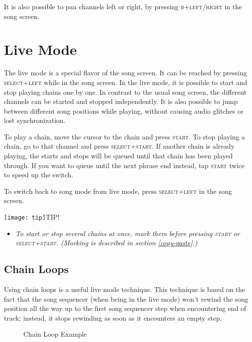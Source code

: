 It is also possible to pan channels left or right, by pressing \textsc{b+left/right} in the song screen.

\section{Live Mode}

 The live mode is a special flavor of the song screen. It can be reached by pressing \textsc{select+left} while in the song screen. In the live mode, it is possible to start and stop playing chains one by one. In contrast to the usual song screen, the different channels can be started and stopped independently. It is also possible to jump between different song positions while playing, without causing audio glitches or lost synchronization.

To play a chain, move the cursor to the chain and press \textsc{start}. To stop playing a chain, go to that channel and press \textsc{select+start}. If another chain is already playing, the starts and stops will be queued until that chain has been played through. If you want to queue until the next phrase end instead, tap \textsc{start} twice to speed up the switch.

To switch back to song mode from live mode, press \textsc{select+left} in the song screen.

\texttt{[image: tip]}TIP!
\begin{itemize}
        \item \textit{To start or stop several chains at once, mark them before pressing \textsc{start} or \textsc{select+start}. (Marking is described in section \ref{copy-paste}.)}
	\end{itemize}

\subsection{Chain Loops}

 Using chain loops is a useful live mode technique. This technique is based on the fact that the song sequencer (when being in the live mode) won't rewind the song position all the way up to the first song sequencer step when encountering end of track; instead, it stops rewinding as soon as it encounters an empty step.

\begin{figure}[htpb]
	\begin{center}
	\end{center}
	\caption{Chain Loop Example}
	\label{fig:chainloop}
\end{figure}


